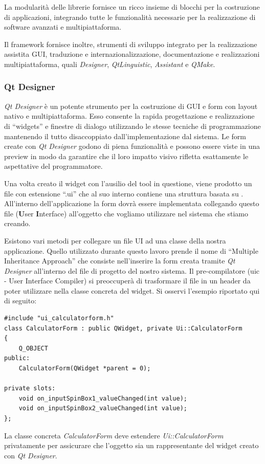 La modularità delle librerie \qt{} fornisce un ricco insieme di blocchi per la costruzione di applicazioni, integrando tutte le funzionalità necessarie per la realizzazione di software avanzati e multipiattaforma.

Il framework fornisce inoltre, strumenti di sviluppo integrato per la realizzazione assistita GUI, traduzione e internazionalizzazione, documentazione e realizzazioni multipiattaforma, quali \emph{Designer}, \emph{QtLinguistic}, \emph{Assistant} e \emph{QMake}.

\subsubsection{Qt Designer}
\emph{Qt Designer} è un potente strumento per la costruzione di GUI e form con layout nativo e multipiattaforma. Esso consente la rapida progettazione e realizzazione di ``widgets'' e finestre di dialogo utilizzando le stesse tecniche di programmazione mantenendo il tutto disaccoppiato dall'implementazione dal sistema. Le form create con \emph{Qt Designer} godono di piena funzionalità e possono essere viste in una preview in modo da garantire che il loro impatto visivo rifletta esattamente le aspettative del programmatore.

Una volta creato il widget con l'ausilio del tool in questione, viene prodotto un file con estensione ``.ui'' che al suo interno contiene una struttura basata su \xml{}. All'interno dell'applicazione la form dovrà essere implementata collegando questo file (\textbf{U}ser \textbf{I}nterface) all'oggetto che vogliamo utilizzare nel sistema che stiamo creando.

Esistono vari metodi per collegare un file UI ad una classe della nostra applicazione. Quello utilizzato durante questo lavoro prende il nome di ``Multiple Inheritance Approach'' che consiste nell'inserire la form creata tramite \emph{Qt Designer} all'interno del file di progetto del nostro sistema. Il pre-compilatore (uic - User Interface Compiler) si preoccuperà di trasformare il file \xml{} in un header \cpp{} da poter utilizzare nella classe concreta del widget. Si osservi l'esempio riportato qui di seguito:
\begin{lstlisting}
#include "ui_calculatorform.h"
class CalculatorForm : public QWidget, private Ui::CalculatorForm
{
    Q_OBJECT
public:
    CalculatorForm(QWidget *parent = 0);

private slots:
    void on_inputSpinBox1_valueChanged(int value);
    void on_inputSpinBox2_valueChanged(int value);
};
\end{lstlisting}
La classe concreta \emph{CalculatorForm} deve estendere \emph{Ui::CalculatorForm} privatamente per assicurare che l'oggetto sia un rappresentante del widget creato con \emph{Qt Designer}.

